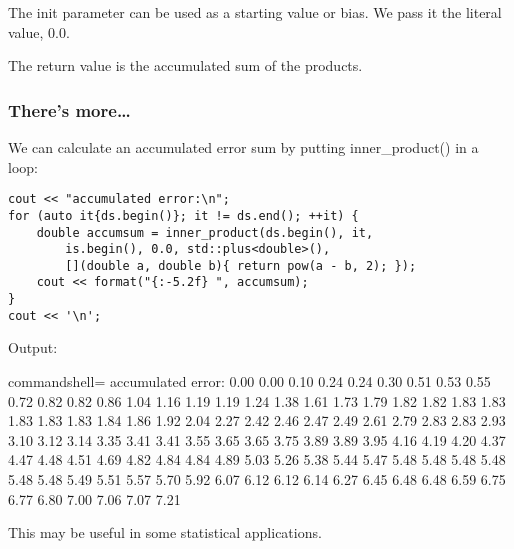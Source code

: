 The init parameter can be used as a starting value or bias. We pass it the literal value, 0.0.

The return value is the accumulated sum of the products.

\subsubsection{There's more…}

We can calculate an accumulated error sum by putting inner\_product() in a loop:

\begin{lstlisting}[style=styleCXX]
cout << "accumulated error:\n";
for (auto it{ds.begin()}; it != ds.end(); ++it) {
	double accumsum = inner_product(ds.begin(), it,
		is.begin(), 0.0, std::plus<double>(),
		[](double a, double b){ return pow(a - b, 2); });
	cout << format("{:-5.2f} ", accumsum);
}
cout << '\n';
\end{lstlisting}

Output:

\begin{tcblisting}{commandshell={}}
accumulated error:
0.00 0.00 0.10 0.24 0.24 0.30 0.51 0.53 0.55 0.72
0.82 0.82 0.86 1.04 1.16 1.19 1.19 1.24 1.38 1.61
1.73 1.79 1.82 1.82 1.83 1.83 1.83 1.83 1.83 1.84
1.86 1.92 2.04 2.27 2.42 2.46 2.47 2.49 2.61 2.79
2.83 2.83 2.93 3.10 3.12 3.14 3.35 3.41 3.41 3.55
3.65 3.65 3.75 3.89 3.89 3.95 4.16 4.19 4.20 4.37
4.47 4.48 4.51 4.69 4.82 4.84 4.84 4.89 5.03 5.26
5.38 5.44 5.47 5.48 5.48 5.48 5.48 5.48 5.48 5.49
5.51 5.57 5.70 5.92 6.07 6.12 6.12 6.14 6.27 6.45
6.48 6.48 6.59 6.75 6.77 6.80 7.00 7.06 7.07 7.21
\end{tcblisting}

This may be useful in some statistical applications.









